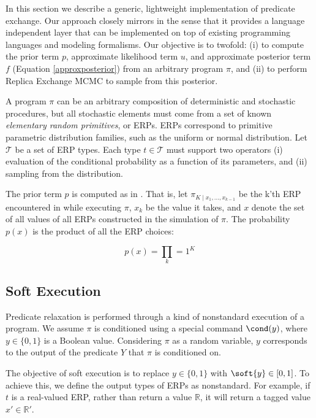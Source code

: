 
In this section we describe a generic, lightweight implementation of predicate exchange.
Our approach closely mirrors \citep{wingate2011lightweight, milch20071} in the sense that it provides a language independent layer that can be implemented on top of existing programming languages and modeling formalisms.
Our objective is to twofold: (i) to compute the prior term $p$, approximate likelihood term $u$, and approximate posterior term $f$ (Equation \ref{approxposterior}) from an arbitrary program $\pi$, and (ii) to perform Replica Exchange MCMC to sample from this posterior.

A program $\pi$ can be an arbitrary composition of deterministic and stochastic procedures, but all stochastic elements must come from a set of known \emph{elementary random primitives}, or ERPs.
ERPs correspond to primitive parametric distribution families, such as the uniform or normal distribution.
Let $\mathcal{T}$ be a set of ERP types.
Each type $t \in \mathcal{T}$ must support two operators (i) evaluation of the conditional probability as a function of its parameters, and (ii) sampling from the distribution.

The prior term $p$ is computed as in \citep{wingate2011lightweight}.
That is, let $\pi_{K \mid x_1, ..., x_{k-1}}$ be the k'th ERP encountered in while executing $\pi$, $x_k$ be the value it takes, and $x$ denote the set of all values of all ERPs constructed in the simulation of $\pi$.
The probability $p(x)$ is the product of all the ERP choices:

$$
p(x) = \prod_k=1^K
$$

\subsection{Soft Execution}
Predicate relaxation is performed through a kind of nonstandard execution of a program.
We assume $\pi$ is conditioned using a special command $\cond(y)$, where $y \in \{0,1\}$ is a Boolean value.
Considering $\pi$ as a random variable, $y$ corresponds to the output of the predicate $Y$ that $\pi$ is conditioned on.

The objective of soft execution is to replace $y \in \{0,1\}$ with $\soft{y} \in [0, 1]$.
To achieve this, we define the output types of ERPs as nonstandard.
For example, if $t$ is a real-valued ERP, rather than return a value $\mathbb{R}$, it will return a tagged value $x' \in \mathbb{R}'$.

